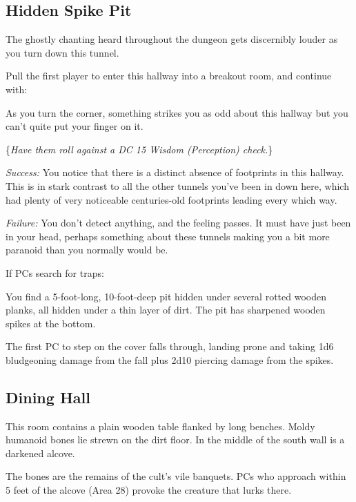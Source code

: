 \subsection{Hidden Spike Pit}
\label{sec:HiddenSpikePit}
\begin{readout}
  The ghostly chanting heard throughout the dungeon gets discernibly louder as you turn down this tunnel. 
\end{readout}
Pull the first player to enter this hallway into a breakout room, and continue with:
\begin{readout}
  As you turn the corner, something strikes you as odd about this hallway but you can't quite put your finger
  on it.
  
  \{\textit{Have them roll against a DC 15 Wisdom (Perception) check.}\}
  
  \textit{Success:} You notice that there is a distinct absence of footprints in this hallway. This is in stark
  contrast to all the other tunnels you've been in down here, which had plenty of very noticeable centuries-old
  footprints leading every which way.
  
  \textit{Failure:} You don't detect anything, and the feeling passes. It must have just been in your head,
  perhaps something about these tunnels making you a bit more paranoid than you normally would be.
\end{readout}
If PCs search for traps:
\begin{readout}
  You find a 5-foot-long, 10-foot-deep pit hidden under several rotted wooden planks, all hidden under a thin
  layer of dirt. The pit has sharpened wooden spikes at the bottom.
\end{readout}
The first PC to step on the cover falls through, landing prone and taking 1d6 bludgeoning damage from the fall
plus 2d10 piercing damage from the spikes.

\begin{arealinks}
\end{arealinks}


\pagebreak
\subsection{Dining Hall}
\label{sec:DiningHall}
\begin{readout}
  This room contains a plain wooden table flanked by long benches. Moldy humanoid bones lie strewn on the dirt
  floor. In the middle of the south wall is a darkened alcove.
\end{readout}
The bones are the remains of the cult's vile banquets. PCs who approach within 5 feet of the alcove (Area 28)
provoke the creature that lurks there.

